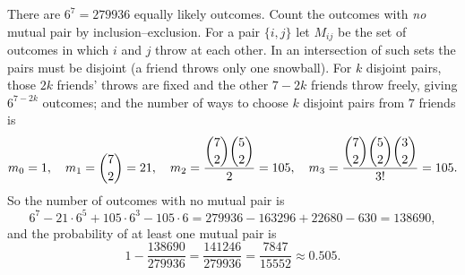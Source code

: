 There are $6^7=279936$ equally likely outcomes. Count the outcomes with \emph{no} mutual pair by inclusion--exclusion. For a pair $\{i,j\}$ let $M_{ij}$ be the set of outcomes in which $i$ and $j$ throw at each other. In an intersection of such sets the pairs must be disjoint (a friend throws only one snowball). For $k$ disjoint pairs, those $2k$ friends' throws are fixed and the other $7-2k$ friends throw freely, giving $6^{7-2k}$ outcomes; and the number of ways to choose $k$ disjoint pairs from $7$ friends is
\[m_0=1,\quad m_1=\dbinom72=21,\quad m_2=\dfrac{\dbinom72\dbinom52}{2}=105,\quad m_3=\dfrac{\dbinom72\dbinom52\dbinom32}{3!}=105.\]
So the number of outcomes with no mutual pair is
\[6^7-21\cdot6^5+105\cdot6^3-105\cdot6=279936-163296+22680-630=138690,\]
and the probability of at least one mutual pair is
\[1-\dfrac{138690}{279936}=\dfrac{141246}{279936}=\boxed{\dfrac{7847}{15552}}\approx0.505.\]
